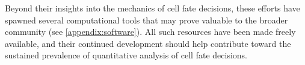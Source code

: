 Beyond their insights into the mechanics of cell fate decisions, these efforts have spawned several computational tools that may prove valuable to the broader community (see \ref{appendix:software}). All such resources have been made freely available, and their continued development should help contribute toward the sustained prevalence of quantitative analysis of cell fate decisions.
